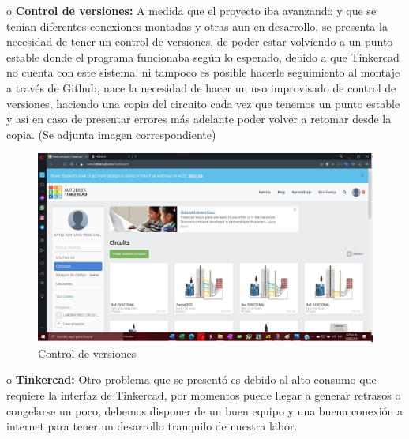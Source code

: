 \documentclass{article}
\begin{document}
o	\textbf{Control de versiones:} A medida que el proyecto iba avanzando y que se tenían diferentes conexiones montadas y otras aun en desarrollo, se presenta la necesidad de tener un control de versiones, de poder estar volviendo a un punto estable donde el programa funcionaba según lo esperado, debido a que Tinkercad no cuenta con este sistema, ni tampoco es posible hacerle seguimiento al montaje a través de Github, nace la necesidad de hacer un uso improvisado de control de versiones, haciendo una copia del circuito cada vez que tenemos un punto estable y así en caso de presentar errores más adelante poder volver a retomar desde la copia. (Se adjunta imagen correspondiente)\par
\begin{figure}[h]
\includegraphics[width=12cm]{control de versiones.jpg}
\centering
\caption{Control de versiones}
\label{fig:control-de-versiones}
\end{figure}

o	\textbf{Tinkercad:} Otro problema que se presentó es debido al alto consumo que requiere la interfaz de Tinkercad, por momentos puede llegar a generar retrasos o congelarse un poco, debemos disponer de un buen equipo y una buena conexión a internet para tener un desarrollo tranquilo de nuestra labor.\par
\end{document}

